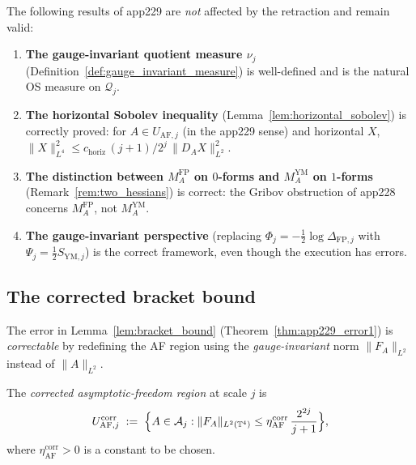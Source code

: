 \begin{remark}
\label{rem:app229_survives}
The following results of app229 are \emph{not} affected by the
retraction and remain valid:
\begin{enumerate}
\item \textbf{The gauge-invariant quotient measure $\nu_{j}$}
(Definition~\ref{def:gauge_invariant_measure}) is well-defined
and is the natural OS measure on $\mathcal{Q}_{j}$.
\item \textbf{The horizontal Sobolev inequality}
(Lemma~\ref{lem:horizontal_sobolev}) is correctly proved: for
$A\in U_{\mathrm{AF},j}$ (in the app229 sense) and horizontal $X$,
$\|X\|_{L^{4}}^{2}\le c_{\mathrm{horiz}}\,(j+1)/2^{j}\,
\|D_{A}X\|_{L^{2}}^{2}$.
\item \textbf{The distinction between $M_{A}^{\mathrm{FP}}$ on
$0$-forms and $M_{A}^{\mathrm{YM}}$ on $1$-forms}
(Remark~\ref{rem:two_hessians}) is correct: the Gribov obstruction
of app228 concerns $M_{A}^{\mathrm{FP}}$, not $M_{A}^{\mathrm{YM}}$.
\item \textbf{The gauge-invariant perspective} (replacing
$\Phi_{j}=-\tfrac{1}{2}\log\Delta_{\mathrm{FP},j}$ with
$\Psi_{j}=\tfrac{1}{2}S_{\mathrm{YM},j}$) is the correct
framework, even though the execution has errors.
\end{enumerate}
\end{remark}

\subsection{The corrected bracket bound}
\label{ssec:app230_fix}

The error in Lemma~\ref{lem:bracket_bound} (Theorem~\ref{thm:app229_error1})
is \emph{correctable} by redefining the AF region using the
\emph{gauge-invariant} norm $\|F_{A}\|_{L^{2}}$ instead of
$\|A\|_{L^{2}}$.

\begin{definition}
\label{def:af_region_corr}
The \emph{corrected asymptotic-freedom region} at scale $j$ is
\begin{equation}
\label{eq:af_region_corr}
  U_{\mathrm{AF},j}^{\mathrm{corr}}
  \;:=\;\Bigl\{A\in\mathcal{A}_{j}:
  \|F_{A}\|_{L^{2}(\mathbb{T}^{4})}\le
  \eta_{\mathrm{AF}}^{\mathrm{corr}}\,\frac{2^{2j}}{j+1}\Bigr\},
\end{equation}
where $\eta_{\mathrm{AF}}^{\mathrm{corr}}>0$ is a constant to be
chosen.
\end{definition}

